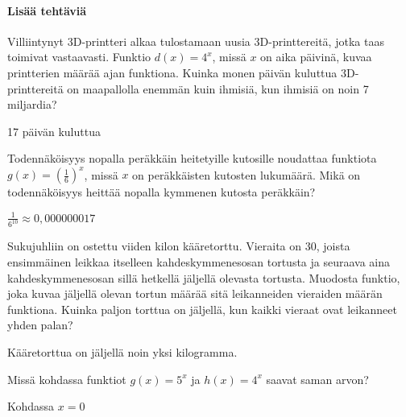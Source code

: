 \begin{tehtavasivu}
\begin{tehtava}
\end{tehtava}

\paragraph*{Lisää tehtäviä}

\begin{tehtava}
Villiintynyt 3D-printteri alkaa tulostamaan uusia 3D-printtereitä, jotka taas toimivat vastaavasti. Funktio $ d(x)=4^{x} $, missä $ x $ on aika päivinä, kuvaa printterien määrää ajan funktiona. Kuinka monen päivän kuluttua 3D-printtereitä on maapallolla enemmän kuin ihmisiä, kun ihmisiä on noin 7 miljardia?
\begin{vastaus}
17 päivän kuluttua
\end{vastaus}
\end{tehtava}

\begin{tehtava}
Todennäköisyys nopalla peräkkäin heitetyille kutosille noudattaa funktiota 
$ g(x)=(\frac{1}{6})^{x} $, missä $x$ on peräkkäisten kutosten lukumäärä.
Mikä on todennäköisyys heittää nopalla kymmenen kutosta peräkkäin?
\begin{vastaus}
$ \frac{1}{6^{10}}\approx0,000000017$
\end{vastaus}
\end{tehtava}

\begin{tehtava}
Sukujuhliin on ostettu viiden kilon kääretorttu. Vieraita on 30, joista ensimmäinen leikkaa itselleen kahdeskymmenesosan tortusta ja seuraava aina kahdeskymmenesosan sillä hetkellä jäljellä olevasta tortusta. Muodosta funktio, joka kuvaa jäljellä olevan tortun määrää sitä leikanneiden vieraiden määrän funktiona. Kuinka paljon torttua on jäljellä, kun kaikki vieraat ovat leikanneet yhden palan?
\begin{vastaus}
Kääretorttua on jäljellä noin yksi kilogramma.
\end{vastaus}
\end{tehtava}

\begin{tehtava}
Missä kohdassa funktiot $ g(x)=5^{x} $ ja $ h(x)=4^{x} $ saavat saman arvon?
\begin{vastaus}
Kohdassa $x=0$
\end{vastaus}
\end{tehtava}


\end{tehtavasivu}

